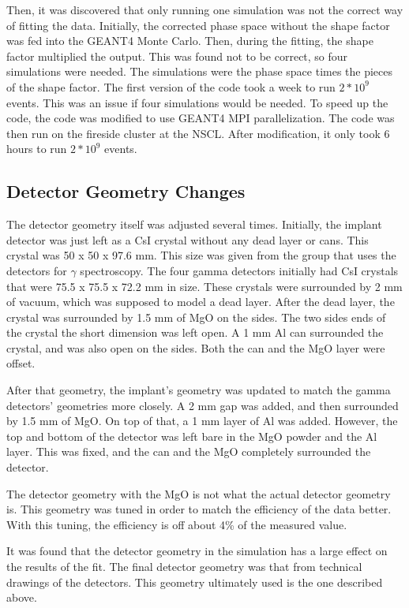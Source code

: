\documentclass[../MaxHughesThesis.tex]{subfiles}
\begin{document}
Then, it was discovered that only running one simulation was not the correct way of fitting the data.
Initially, the corrected phase space without the shape factor was fed into the GEANT4 Monte Carlo.
Then, during the fitting, the shape factor multiplied the output. 
This was found not to be correct, so four simulations were needed.
The simulations were the phase space times the pieces of the shape factor.
The first version of the code took a week to run $2 * 10^{9}$ events.
This was an issue if four simulations would be needed.
To speed up the code, the code was modified to use GEANT4 MPI parallelization.
The code was then run on the fireside cluster at the NSCL.
After modification, it only took 6 hours to run $2 * 10^{9}$ events.

\subsection{Detector Geometry Changes}
The detector geometry itself was adjusted several times.
Initially, the implant detector was just left as a CsI crystal without any dead layer or cans.
This crystal was 50 x 50 x 97.6 mm.
This size was given from the group that uses the detectors for $\gamma$ spectroscopy.
The four gamma detectors initially had CsI crystals that were 75.5 x 75.5 x 72.2 mm in size.
These crystals were surrounded by 2 mm of vacuum, which was supposed to model a dead layer.
After the dead layer, the crystal was surrounded by 1.5 mm of MgO on the sides.
The two sides ends of the crystal the short dimension was left open.
A 1 mm Al can surrounded the crystal, and was also open on the sides.
Both the can and the MgO layer were offset.

After that geometry, the implant's geometry was updated to match the gamma detectors' geometries more closely.
A 2 mm gap was added, and then surrounded by 1.5 mm of MgO. 
On top of that, a 1 mm layer of Al was added.
However, the top and bottom of the detector was left bare in the MgO powder and the Al layer.
This was fixed, and the can and the MgO completely surrounded the detector.

The detector geometry with the MgO is not what the actual detector geometry is.
This geometry was tuned in order to match the efficiency of the data better.
With this tuning, the efficiency is off about 4\% of the measured value. 

It was found that the detector geometry in the simulation has a large effect on the results of the fit.
The final detector geometry was that from technical drawings of the detectors.
This geometry ultimately used  is the one described above. 
\end{document}
